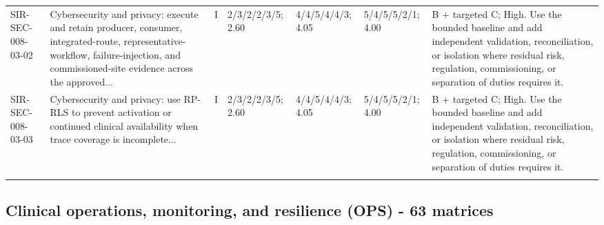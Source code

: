 \documentclass[11pt,letterpaper]{article}
\begin{document}
\begin{scriptsize}
\begin{longtable}{@{}L{0.11\textwidth}L{0.165\textwidth}L{0.04\textwidth}L{0.115\textwidth}L{0.115\textwidth}L{0.115\textwidth}L{0.235\textwidth}@{}}
\addlinespace[2pt]
SIR-SEC-008-03-02 & Cybersecurity and privacy: execute and retain producer, consumer, integrated-route, representative-workflow, failure-injection, and commissioned-site evidence across the approved... & I & 2/3/2/2/3/5; 2.60 & 4/4/5/4/4/3; 4.05 & 5/4/5/5/2/1; 4.00 & B + targeted C; High. Use the bounded baseline and add independent validation, reconciliation, or isolation where residual risk, regulation, commissioning, or separation of duties requires it. \\
\addlinespace[2pt]
SIR-SEC-008-03-03 & Cybersecurity and privacy: use RP-RLS to prevent activation or continued clinical availability when trace coverage is incomplete... & I & 2/3/2/2/3/5; 2.60 & 4/4/5/4/4/3; 4.05 & 5/4/5/5/2/1; 4.00 & B + targeted C; High. Use the bounded baseline and add independent validation, reconciliation, or isolation where residual risk, regulation, commissioning, or separation of duties requires it. \\
\addlinespace[2pt]
\end{longtable}
\end{scriptsize}

\subsection{Clinical operations, monitoring, and resilience (OPS) - 63 matrices}
\end{document}
